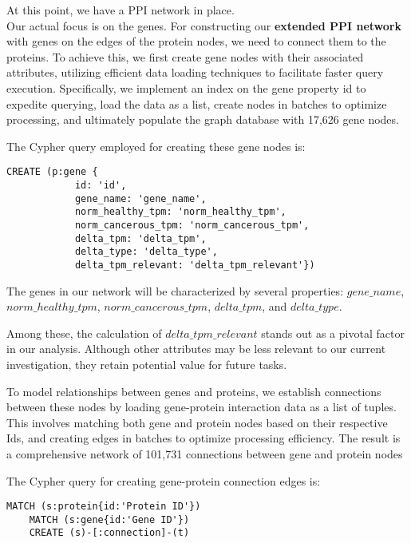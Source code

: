 At this point, we have a PPI network in place. \\


Our actual focus is on the genes.
For constructing our \textbf{extended PPI network} with genes on the edges of the protein nodes, we need to connect them to the proteins.
To achieve this, we first create gene nodes with their associated attributes,
utilizing efficient data loading techniques to facilitate faster query execution.
Specifically, we implement an index on the gene property id to expedite querying,
load the data as a list, create nodes in batches to optimize processing,
and ultimately populate the graph database with 17,626 gene nodes.

The Cypher query employed for creating these gene nodes is:
\begin{lstlisting}[language=Cypher, label={lst:gene_nodes}]
    CREATE (p:gene {
            id: 'id',
            gene_name: 'gene_name',
            norm_healthy_tpm: 'norm_healthy_tpm',
            norm_cancerous_tpm: 'norm_cancerous_tpm',
            delta_tpm: 'delta_tpm',
            delta_type: 'delta_type',
            delta_tpm_relevant: 'delta_tpm_relevant'})
\end{lstlisting}

The genes in our network will be characterized by several properties:
$gene\_name$, $norm\_healthy\_tpm$, $norm\_cancerous\_tpm$, $delta\_tpm$, and $delta\_type$.


Among these, the calculation of $delta\_tpm\_relevant$ stands out as a pivotal factor in our analysis.
Although other attributes may be less relevant to our current investigation, they retain potential value for future tasks.

To model relationships between genes and proteins,
we establish connections between these nodes by loading gene-protein interaction data as a list of tuples.
This involves matching both gene and protein nodes based on their respective Ids,
and creating edges in batches to optimize processing efficiency.
The result is a comprehensive network of 101,731 connections between gene and protein nodes

The Cypher query for creating gene-protein connection edges is:
\begin{lstlisting}[language=Cypher, label={lst:gene_protein_edges}]
    MATCH (s:protein{id:'Protein ID'})
    MATCH (s:gene{id:'Gene ID'})
    CREATE (s)-[:connection]-(t)
\end{lstlisting}

